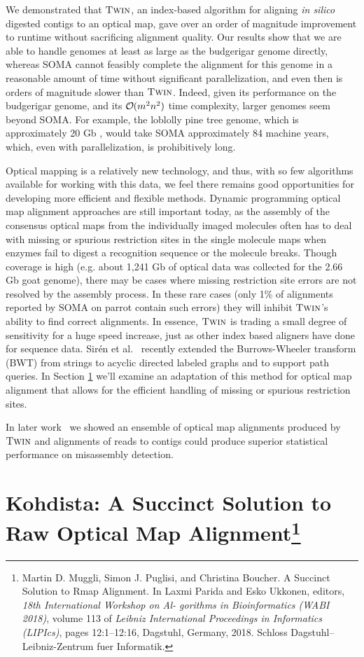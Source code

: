 We demonstrated that $\mbox{\rm \textsc{Twin}}$, an index-based algorithm for aligning \emph{in silico} digested contigs to an optical map, gave over an order of magnitude improvement to runtime without sacrificing alignment quality. Our results show that we are able to handle genomes at least as large as the budgerigar genome directly, whereas SOMA cannot feasibly complete the alignment for this genome in a reasonable amount of time without significant parallelization, and even then is orders of magnitude slower than $\mbox{\rm \textsc{Twin}}$. Indeed, given its performance on the budgerigar genome, and its $\bigO(m^2 n^2)$ time complexity, larger genomes seem beyond SOMA.  For example, the loblolly pine tree genome, which is approximately 20 Gb \cite{pinetree}, would take SOMA approximately 84 machine years, which, even with parallelization, is prohibitively long.

Optical mapping is a relatively new technology, and thus, with so few algorithms available for working with this data, we feel there remains good opportunities for developing more efficient and flexible methods. Dynamic programming optical map alignment approaches are still important today, as the assembly of the consensus optical maps from the individually imaged molecules often has to deal with missing or spurious restriction sites in the single molecule maps when enzymes fail to digest a recognition sequence or the molecule breaks.  Though coverage is high (e.g. about 1,241 Gb of optical data was collected for the 2.66 Gb goat genome), there may be cases where missing restriction site errors are not resolved by the assembly process.   In these rare cases (only 1\% of alignments reported by SOMA on parrot contain such errors) they will inhibit $\mbox{\rm \textsc{Twin}}$'s ability to find correct alignments.  In essence, $\mbox{\rm \textsc{Twin}}$ is trading a small degree of sensitivity for a huge speed increase, just as other index based aligners have done for sequence data.  Sir\'{e}n et al.~\cite{dag_method} recently extended the Burrows-Wheeler transform (BWT) from strings to acyclic directed labeled graphs and to support path queries. In Section \ref{sec:kohdista} we'll examine an adaptation of this method for optical map alignment that allows for the efficient handling of missing or spurious restriction sites.

In later work~\cite{muggli2015misassembly} we showed an ensemble of optical map alignments produced by $\mbox{\rm \textsc{Twin}}$ and alignments of reads to contigs could produce superior statistical performance on misassembly detection.


\section[Kohdista: A Succinct Solution to Raw Optical Map Alignment]{Kohdista: A Succinct Solution to Raw Optical Map Alignment\protect\footnote{Martin D. Muggli, Simon J. Puglisi, and Christina Boucher. A Succinct Solution to Rmap
		Alignment. In Laxmi Parida and Esko Ukkonen, editors, {\it 18th International Workshop on Al-
		gorithms in Bioinformatics (WABI 2018)}, volume 113 of {\it Leibniz International Proceedings
		in Informatics (LIPIcs)}, pages 12:1–12:16, Dagstuhl, Germany, 2018. Schloss Dagstuhl–
		Leibniz-Zentrum fuer Informatik.}}
\label{sec:kohdista}

